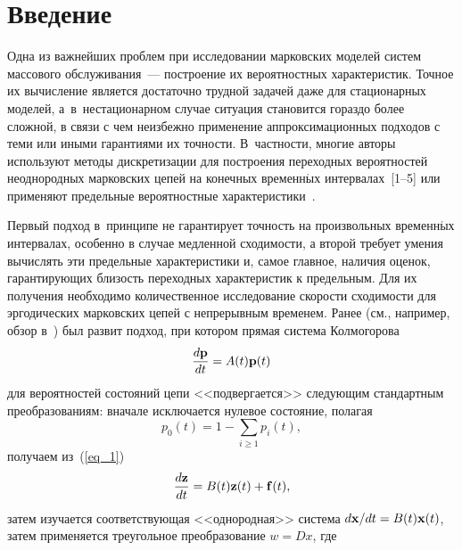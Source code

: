     

  



\thispagestyle{headings}

\begin{multicols}{2}

\label{st\stat}
    
        \section{Введение}
        
Одна из важнейших проблем при исследовании марковских моделей систем массового 
обслуживания~--- построение их вероятностных характеристик. Точное их вычисление 
является достаточно трудной задачей даже для стационарных моделей, 
а~в~нестационарном случае ситуация становится гораздо более сложной, в связи с чем 
неизбежно применение аппроксимационных подходов с теми или иными гарантиями их 
точности. В~частности, многие авторы используют методы дискретизации для 
построения переходных вероятностей неоднородных марковских цепей на конечных 
временн$\acute{\mbox{ы}}$х интервалах~[1--5]
или применяют предельные вероятностные характеристики~\cite{chak}. 

Первый подход 
в~принципе не гарантирует точность на произвольных временн$\acute{\mbox{ы}}$х интервалах, 
особенно в случае медленной сходимости, а второй требует умения вычислять эти 
предельные характеристики и, самое главное, наличия оценок, гарантирующих 
близость переходных характеристик к предельным.
Для их получения необходимо количественное исследование скорости сходимости для 
эргодических марковских цепей с непрерывным временем. Ранее (см., например, 
обзор в~\cite{Zeifman2020porto}) был развит подход, при котором прямая система 
Колмогорова
\begin{equation}
\label{eq_1}
\displaystyle\frac{\displaystyle d{\mathbf p}\mathstrut}{\displaystyle dt\mathstrut}=A(t){\mathbf p}(t)
\end{equation}
для вероятностей состояний цепи <<подвергается>> следующим стандартным 
преобразованиям:
вначале исключается нулевое состояние, полагая
$$
p_0\left( t\right) =1-\sum\limits_{i\geq 1}p_i\left( t\right),
$$
получаем из~(\ref{eq_1})
\begin{equation*}
\displaystyle\frac{\displaystyle d{\mathbf z}\mathstrut}{\displaystyle dt\mathstrut}=B(t){\mathbf z}(t)+{\mathbf f}(t),
\end{equation*}
затем изучается соответствующая <<однородная>> сис\-те\-ма 
${d{\mathbf x}}/{dt}=B(t){\mathbf x}(t)$,
затем применяется треугольное преобразование $w=Dx$, где


\end{multicols}
